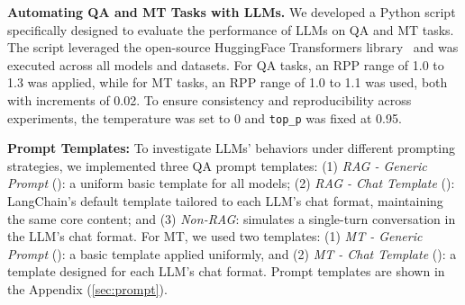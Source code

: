 \textbf{Automating QA and MT Tasks with LLMs.} 
We developed a Python script specifically designed to evaluate the performance of LLMs on QA and MT tasks. The script leveraged the open-source HuggingFace Transformers library~\cite{wolf2020transformers} and was executed across all models and datasets. For QA tasks, an RPP range of 1.0 to 1.3 was applied, while for MT tasks, an RPP range of 1.0 to 1.1 was used, both with increments of 0.02. To ensure consistency and reproducibility across experiments, the temperature was set to 0 and \texttt{top\_p} was fixed at 0.95.


\textbf{Prompt Templates:} 
To investigate LLMs’ behaviors under different prompting strategies, we implemented three QA prompt templates: (1) \textit{RAG - Generic Prompt} (\raggen): a uniform basic template for all models; (2) \textit{RAG - Chat Template} (\ragtem): LangChain’s default template tailored to each LLM’s chat format, maintaining the same core content; and (3) \textit{Non-RAG}: simulates a single-turn conversation in the LLM’s chat format.
For MT, we used two templates: (1) \textit{MT - Generic Prompt} (\mtgen): a basic template applied uniformly, and (2) \textit{MT - Chat Template} (\mttem): a template designed for each LLM’s chat format. Prompt templates are shown in the Appendix (\ref{sec:prompt}). 

